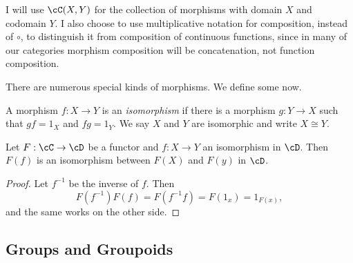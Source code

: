 \begin{dfn}[Category]
\begin{figure}[H]
\begin{multicols}{2}
		\end{multicols}
	\end{figure}
\end{dfn}

\begin{notation}
	I will use $\cC(X, Y)$ for the collection of morphisms with domain $X$ and
	codomain $Y$. I also choose to use multiplicative notation for composition,
	instead of $\circ$, to distinguish it from composition of continuous
	functions, since in many of our categories morphism composition will be
	concatenation, not function composition.
\end{notation}

There are numerous special kinds of morphisms. We define some now.

\begin{dfn}[Isomorphism]
	A morphism $f: X\rightarrow Y$ is an \emph{isomorphism} if there is a morphism
	$g: Y\rightarrow X$ such that $gf = 1_X$ and $fg = 1_Y$. We say $X$ and $Y$
	are isomorphic and write $X\cong Y$.
\end{dfn}

\begin{thm}\label{functors preserve isomorphism}
	Let $F: \cC\rightarrow \cD$ be a functor and $f: X\rightarrow Y$ an isomorphism in
	$\cD$. Then $F(f)$ is an isomorphism between $F(X)$ and $F(y)$ in $\cD$.
\end{thm}

\begin{proof}
	Let $f^{-1}$ be the inverse of $f$. Then $$F(f^{-1})F(f) = F(f^{-1}f) = F(1_x)
		= 1_{F(x)},$$ and the same works on the other side.
\end{proof}


\subsection{Groups and Groupoids}




